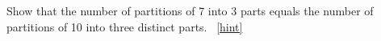 \documentclass{book}
\begin{document}
\setcounter{project}{311}
\addtocounter{project}{-1}
\begin{activity}[]\label{activity-304}
\hypertarget{p-1583}{}%
Show that the number of partitions of 7 into 3 parts equals the number of partitions of 10 into three distinct parts.%
~\hfill{\tiny\hyperlink{a-311}{[hint]}\hypertarget{q-311}{}}\end{activity}
\end{document}

